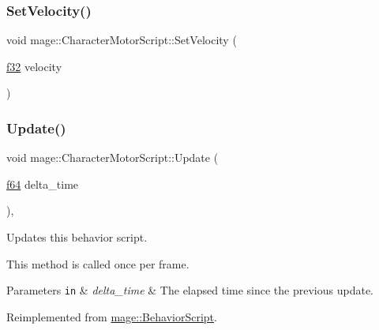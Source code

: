 \hypertarget{classmage_1_1_character_motor_script_a1b466080fd5e8ce1ede87c767befb1bd}{}\label{classmage_1_1_character_motor_script_a1b466080fd5e8ce1ede87c767befb1bd} 
\subsubsection{\texorpdfstring{Set\+Velocity()}{SetVelocity()}}
{\footnotesize\ttfamily void mage\+::\+Character\+Motor\+Script\+::\+Set\+Velocity (\begin{DoxyParamCaption}\item[{\hyperlink{namespacemage_a6a44ad388483959dc4dff9f2aef91431}{f32}}]{velocity }\end{DoxyParamCaption})\hspace{0.3cm}{\ttfamily [noexcept]}}

\hypertarget{classmage_1_1_character_motor_script_ac0ac58ac7a878c5dad5222e5af673179}{}\label{classmage_1_1_character_motor_script_ac0ac58ac7a878c5dad5222e5af673179} 
\subsubsection{\texorpdfstring{Update()}{Update()}}
{\footnotesize\ttfamily void mage\+::\+Character\+Motor\+Script\+::\+Update (\begin{DoxyParamCaption}\item[{\hyperlink{namespacemage_ab935747c6941320bd6214b5a5f265b09}{f64}}]{delta\+\_\+time }\end{DoxyParamCaption})\hspace{0.3cm}{\ttfamily [override]}, {\ttfamily [virtual]}}

Updates this behavior script.

This method is called once per frame.


\begin{DoxyParams}[1]{Parameters}
\mbox{\tt in}  & {\em delta\+\_\+time} & The elapsed time since the previous update. \\
\hline
\end{DoxyParams}


Reimplemented from \hyperlink{classmage_1_1_behavior_script_ae42e869ca8d4e4b3ad2af589b0ca9924}{mage\+::\+Behavior\+Script}.




